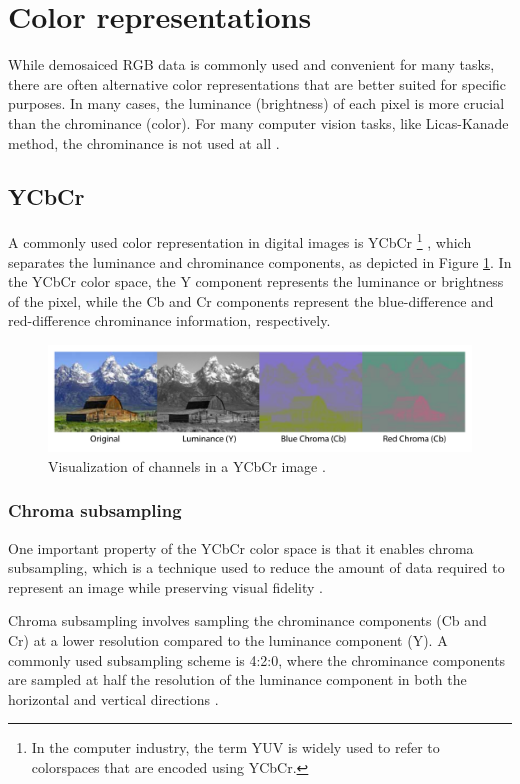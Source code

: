 \section{Color representations}
While demosaiced RGB data is commonly used and convenient for many tasks, there are often alternative color representations that are better suited for specific purposes.
In many cases, the luminance (brightness) of each pixel is more crucial than the chrominance (color).
For many computer vision tasks, like Licas-Kanade method, the chrominance is not used at all \cite{lucasIterativeImageRegistration1981}.

\subsection{YCbCr}
A commonly used color representation in digital images is YCbCr
\footnote{In the computer industry, the term YUV is widely used to refer to colorspaces that are encoded using YCbCr.}
, which separates the luminance and chrominance components, as depicted in Figure \ref{fig:ycbcr_example}.
In the YCbCr color space, the Y component represents the luminance or brightness of the pixel, while the Cb and Cr components represent the blue-difference and red-difference chrominance information, respectively.

\begin{figure}[H]
    \centering
    \includegraphics[width=\textwidth]{figures/debayer/YCbCr_example.pdf}
    \caption{Visualization of channels in a YCbCr image \cite{photoEnglishJohnMoulton2004}.}
    \label{fig:ycbcr_example}
\end{figure}

\subsubsection{Chroma subsampling}
One important property of the YCbCr color space is that it enables chroma subsampling, which is a technique used to reduce the amount of data required to represent an image while preserving visual fidelity \cite{ChromaSubsampling2023}.

Chroma subsampling involves sampling the chrominance components (Cb and Cr) at a lower resolution compared to the luminance component (Y).
A commonly used subsampling scheme is 4:2:0, where the chrominance components are sampled at half the resolution of the luminance component in both the horizontal and vertical directions \cite{ChromaSubsampling2023}.

